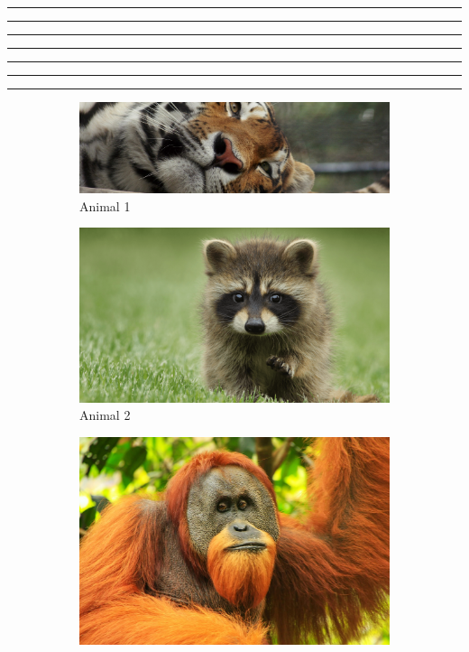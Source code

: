 \documentclass[12pt]{article}
\begin{document}
\listoffigures

\vfill
{\color{Magenta4}\rule{\linewidth}{3mm}}
\vfill
{\color{Seashell4!60!SlateBlue4!}\rule{\linewidth}{3mm}}
\vfill
{\color{blue!20!red!40!}\rule{\linewidth}{3mm}}
\vfill
{\color{Tomato1}\rule{\linewidth}{3mm}}
\vfill
{\color{Firebrick1}\rule{\linewidth}{3mm}}
\vfill
{\color{Firebrick4!50!DeepPink1!90!}\rule{\linewidth}{3mm}}
\vfill
{\color[rgb]{0.169,0, 0.6}\rule{\linewidth}{3mm}}



\newpage
\begin{figure}
    \centering
    \begin{subfigure}{0.49\linewidth}
    \centering
    \includegraphics[width=0.7\linewidth]{animals/animal1.jpeg}
    \caption{Animal 1}
    \label{fig:animal1}
    \end{subfigure}
    \begin{subfigure}{0.49\linewidth}
    \centering
    \includegraphics[width=0.7\linewidth]{animals/animal2.png}
    \caption{Animal 2}
    \label{fig:animal2}
    \end{subfigure}
    \begin{subfigure}{0.49\linewidth}
    \centering
    \includegraphics[width=0.7\linewidth]{animals/animal3.jpg}

\end{subfigure}
\end{figure}
\end{document}

